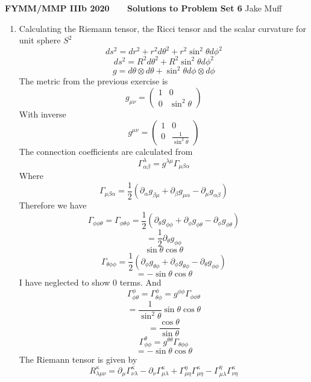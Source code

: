 \documentclass[12pt]{article}
\begin{document}
\normalsize

\baselineskip 14pt

\begin{center}
{\Large {\bf FYMM/MMP IIIb 2020 \ \ \  Solutions to Problem Set 6}}
Jake Muff
\end{center}

\bigskip

\begin{enumerate}
  \item Calculating the Riemann tensor, the Ricci tensor and the scalar curvature for unit sphere $S^2$
  $$ ds^2 = dr^2 + r^2 d \theta^2 + r^2 \sin^2 \theta d \phi^2 $$
  $$ ds^2 = R^2 d \theta^2 + R^2 \sin^2 \theta d \phi^2 $$
  $$ g = d \theta \otimes d \theta + \sin^2 \theta d \phi \otimes d \phi $$
  The metric from the previous exercise is 
  $$ g_{\mu \nu} = \begin{pmatrix}
    1 & 0 \\ 0 & \sin^2 \theta
  \end{pmatrix} $$
  With inverse 
  $$ g^{\mu \nu} = \begin{pmatrix}
    1 & 0 \\ 0 & \frac{1}{\sin^2 \theta} 
  \end{pmatrix} $$
  The connection coefficients are calculated from 
  $$ \Gamma^{\lambda}_{\alpha \beta} = g^{\lambda \mu} \Gamma_{\mu \beta \alpha} $$
  Where 
  $$ \Gamma_{\mu \beta \alpha} =\frac{1}{2}  ( \partial_{\alpha} g_{\beta \mu} + \partial_{\beta} g_{\mu \alpha} - \partial_{\mu} g_{\alpha \beta} ) $$
  Therefore we have 
  $$ \Gamma_{\phi \phi \theta} = \Gamma_{\phi \theta \phi} = \frac{1}{2} ( \partial_{\theta} g_{\phi \phi} + \partial_{\phi} g_{\phi \theta} - \partial_{\phi} g_{\phi \theta} ) $$
  $$ = \frac{1}{2} \partial_{\theta} g_{\phi \phi} $$
  $$ \sin \theta \cos \theta $$
  $$ \Gamma_{\theta \phi \phi} = \frac{1}{2} ( \partial_{\phi} g_{\theta \phi} + \partial_{\phi} g_{\theta \phi} - \partial_{\theta} g_{\phi \phi} ) $$
  $$  = - \sin \theta \cos \theta $$
  I have neglected to show 0 terms. And 
  $$ \Gamma^{\phi}_{\phi \theta} = \Gamma^{\phi}_{\theta \phi} = g^{\phi \phi} \Gamma_{\phi \phi \theta} $$
  $$ = \frac{1}{\sin^2 \theta} \sin \theta \cos \theta $$
  $$ = \frac{\cos \theta}{\sin \theta} $$
  $$ \Gamma^{\theta}_{\phi \phi} = g^{\theta \theta} \Gamma_{\theta \phi \phi} $$ 
  $$ = - \sin \theta \cos \theta $$
  The Riemann tensor is given by 
  $$ R^{\kappa}_{\lambda \mu \nu} = \partial_{\mu} \Gamma^{\kappa}_{\nu \lambda} - \partial_{\nu} \Gamma^{\kappa}_{\mu \lambda} + \Gamma^{\eta}_{\mu \eta} \Gamma^{\kappa}_{\mu \eta} - \Gamma^{\eta}_{\mu \lambda} \Gamma^{\kappa}_{\nu \eta} $$

\end{enumerate}
\end{document}
